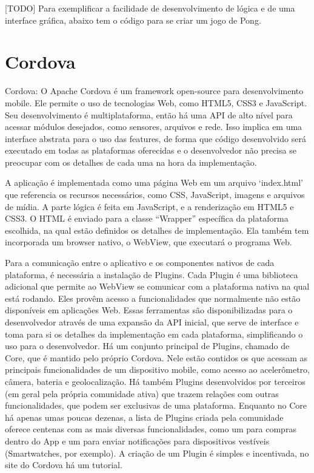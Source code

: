 \documentclass[a4paper,12pt]{article}
\begin{document}
[TODO] Para exemplificar a facilidade de desenvolvimento de lógica e de uma interface gráfica, abaixo tem o código para se criar um jogo de Pong.













\section{Cordova}

Cordova:
O Apache Cordova é um framework open-source para desenvolvimento mobile. Ele permite o uso de tecnologias Web, como HTML5, CSS3 e JavaScript. Seu desenvolvimento é multiplataforma, então há uma API de alto nível para acessar módulos desejados, como sensores, arquivos e rede. Isso implica em uma interface abstrata para o uso das features, de forma que código desenvolvido será executado em todas as plataformas oferecidas e o desenvolvedor não precisa se preocupar com os detalhes de cada uma na hora da implementação.


A aplicação é implementada como uma página Web em um arquivo ‘index.html’ que referencia os recursos necessários, como CSS, JavaScript, imagens e arquivos de mídia. A parte lógica é feita em JavaScript, e a renderização em HTML5 e CSS3. O HTML é enviado para a classe “Wrapper” específica da plataforma escolhida, na qual estão definidos os detalhes de implementação. Ela também tem incorporada um browser nativo, o WebView, que executará o programa Web.


Para a comunicação entre o aplicativo e os componentes nativos de cada plataforma, é necessária a instalação de Plugins.
Cada Plugin é uma biblioteca adicional que permite ao WebView se comunicar com a plataforma nativa na qual está rodando. Eles provêm acesso a funcionalidades que normalmente não estão disponíveis em aplicações Web. Essas ferramentas são disponibilizadas para o desenvolvedor através de uma expansão da API inicial, que serve de interface e toma para si os detalhes da implementação em cada plataforma, simplificando o uso para o desenvolvedor.
Há um conjunto principal de Plugins, chamado de Core, que é mantido pelo próprio Cordova. Nele estão contidos os que acessam as principais funcionalidades de um dispositivo mobile, como acesso ao acelerômetro, câmera, bateria e geolocalização.
Há também Plugins desenvolvidos por terceiros (em geral pela própria comunidade ativa) que trazem relações com outras funcionalidades, que podem ser exclusivas de uma plataforma. Enquanto no Core há apenas umas poucas dezenas, a lista de Plugins criada pela comunidade oferece centenas com as mais diversas funcionalidades, como um para compras dentro do App e um para enviar notificações para dispositivos vestíveis (Smartwatches, por exemplo). A criação de um Plugin é simples e incentivada, no site do Cordova há um tutorial.
\end{document}
